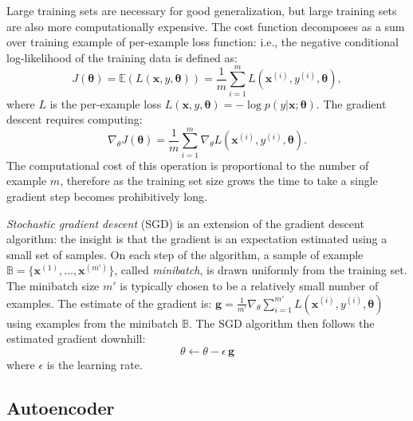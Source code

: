 Large training sets are necessary for good generalization, but large training sets are also more computationally expensive.
The cost function decomposes as a sum over training example of per-example loss function:
i.e., the negative conditional log-likelihood of the training data is defined as:
\begin{equation}
J(\mathbf{\theta}) = \mathbb{E}(L(\textbf{x}, y, \mathbf{\theta})) = \frac{1}{m} \sum\limits_{i=1}^{m} L(\textbf{x}^{(i)}, y^{(i)}, \mathbf{\theta}),
\end{equation}
where $L$ is the per-example loss $L(\textbf{x}, y, \mathbf{\theta}) = - \log p(y|\textbf{x};\mathbf{\theta})$.
The gradient descent requires computing:
\begin{equation}
\nabla_{\theta} J(\mathbf{\theta}) = \frac{1}{m} \sum\limits_{i=1}^{m} \nabla_{\theta} L(\textbf{x}^{(i)}, y^{(i)}, \mathbf{\theta}).
\end{equation}
The computational cost of this operation is proportional to the number of example $m$, therefore as the training set size grows the time to take a single gradient step becomes prohibitively long.

\textit{Stochastic gradient descent} (SGD) is an extension of the gradient descent algorithm: the insight is that the gradient is an expectation estimated using a small set of samples.
On each step of the algorithm, a sample of example $\mathbb{B} = \{ \textbf{x}^{(1)}, \ldots, \textbf{x}^{(m')}\}$, called \textit{minibatch}, is drawn uniformly from the training set.
The minibatch size $m'$ is typically chosen to be a relatively small number of examples.
The estimate of the gradient is:
$\textbf{g} = \frac{1}{m'} \nabla_{\theta} \sum\limits_{i=1}^{m'} L(\textbf{x}^{(i)}, y^{(i)}, \mathbf{\theta})$
using examples from the minibatch $\mathbb{B}$.
The SGD algorithm then follows the estimated gradient downhill:
\begin{equation}
\theta \leftarrow \theta - \epsilon\,\textbf{g}
\end{equation}
where $\epsilon$ is the learning rate.






\subsection{Autoencoder}
\label{sec:autoencoder_theory}
%



